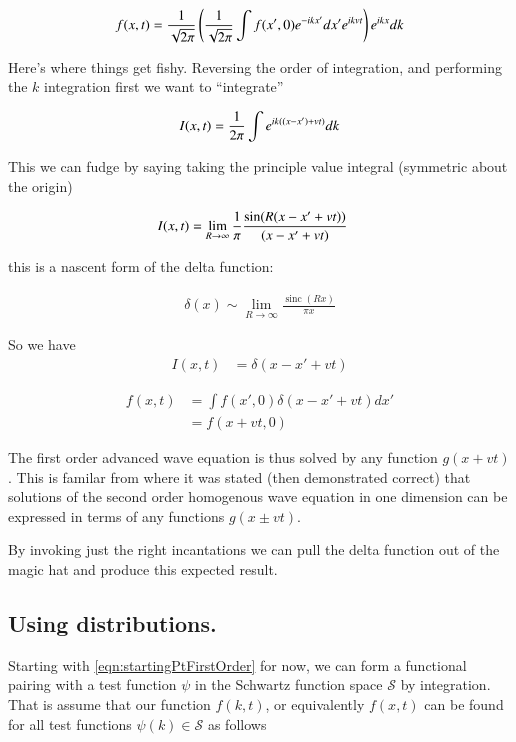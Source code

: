\documentclass{article}
\DeclareMathOperator{\sinc}{sinc}
\newcommand{\Sw}[0]{\mathcal{S}}
\begin{document}
\begin{align*}
{{f}}(x,t) = \frac{1}{\sqrt{2\pi}} \left( \frac{1}{\sqrt{2\pi}}\int f(x',0) e^{-i k x'} dx' e^{i k v t} \right) e^{ i k x } dk
\end{align*}

Here's where things get fishy.  Reversing the order of integration, and performing
the $k$ integration first we want to ``integrate''

\begin{align*}
I(x,t) = \frac{1}{2\pi} \int e^{ i k ((x-x') + v t) } dk
\end{align*}

This we can fudge by saying taking the principle value integral (symmetric about the origin)

\begin{align*}
I(x,t) &= \lim_{R \rightarrow \infty} \frac{1}{\pi} \frac{\sin( R (x-x' + v t) )}{ (x-x' + vt)}
\end{align*}

this is a nascent form of the delta function:

\begin{align*}
\delta(x) \sim \lim_{R \rightarrow \infty} \frac{\sinc( R x )}{\pi x}
\end{align*}

So we have
\begin{align*}
I(x,t) &= \delta(x - x' + v t) 
\end{align*}

\begin{align*}
{{f}}(x,t) 
&= \int f(x',0) \delta(x - x' + v t) dx' \\
&= f(x + v t,0) 
\end{align*}

The first order advanced wave equation is thus solved by any function $g(x + vt)$.  This
is familar from
\cite{french1971vaw} where it was stated (then demonstrated correct) that solutions of the second
order homogenous wave equation in one dimension can be expressed in terms of any functions
$g(x \pm vt)$.

By invoking just the right incantations we can pull the delta function out of the magic hat and 
produce this expected result.

\subsection{ Using distributions. }

Starting with \ref{eqn:startingPtFirstOrder} for now, we can form a functional pairing with a test function $\psi$ in the Schwartz function space $\Sw$ by integration.  That is
assume that our function $\hat{f}(k,t)$, or equivalently $f(x,t)$ can be found for all test functions $\psi(k) \in \Sw$ as follows
\end{document}
